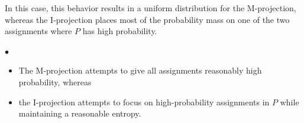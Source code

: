 \documentclass{article}
\begin{document}
\begin{rema}
In this case, this behavior results in a uniform distribution for the M-projection, whereas the I-projection places most of the probability mass on one of the two assignments where $P$ has high probability.
\end{rema}


$\bullet$ 

\begin{itemize}
    \item The M-projection attempts to give all assignments reasonably high probability, whereas 
    \item the I-projection attempts to focus on high-probability assignments in $P$ while maintaining a reasonable entropy. 
\end{itemize}
\end{document}
